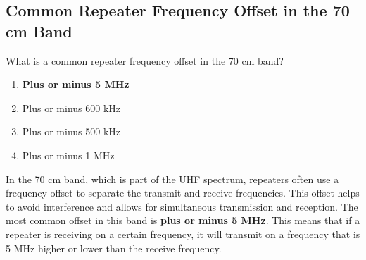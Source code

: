 \subsection{Common Repeater Frequency Offset in the 70 cm Band}
\label{T2A03}

\begin{tcolorbox}[colback=gray!10!white,colframe=black!75!black,title=T2A03]
What is a common repeater frequency offset in the 70 cm band?
\begin{enumerate}[noitemsep]
    \item \textbf{Plus or minus 5 MHz}
    \item Plus or minus 600 kHz
    \item Plus or minus 500 kHz
    \item Plus or minus 1 MHz
\end{enumerate}
\end{tcolorbox}

In the 70 cm band, which is part of the UHF spectrum, repeaters often use a frequency offset to separate the transmit and receive frequencies. This offset helps to avoid interference and allows for simultaneous transmission and reception. The most common offset in this band is \textbf{plus or minus 5 MHz}. This means that if a repeater is receiving on a certain frequency, it will transmit on a frequency that is 5 MHz higher or lower than the receive frequency.